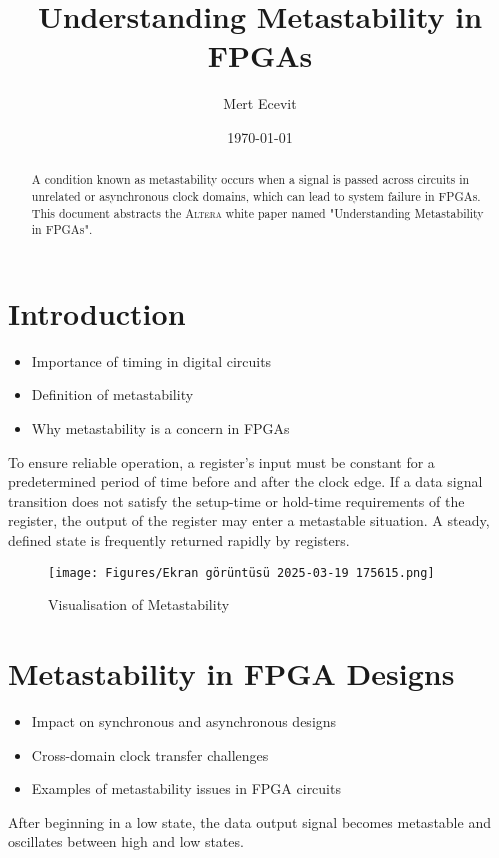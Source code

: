 \documentclass{article}
\title{Understanding Metastability in FPGAs}
\author{Mert Ecevit}
\date{\today}
\begin{document}
\maketitle
\newpage %

\begin{abstract}
A condition known as metastability occurs when a signal is passed across circuits in unrelated or asynchronous clock domains, which can lead to system failure in FPGAs. This document abstracts the \textsc{Altera} white paper named "Understanding Metastability in FPGAs".
\end{abstract}

\section{Introduction}
\begin{itemize}
    \item Importance of timing in digital circuits
    \item Definition of metastability
    \item Why metastability is a concern in FPGAs
\end{itemize}
To ensure reliable operation, a register's input must be constant for a predetermined period of time before and after the clock edge. If a data signal transition does not satisfy the setup-time or hold-time requirements of the register, the output of the register may enter a metastable situation. A steady, defined state is frequently returned rapidly by registers.\cite{altera_metastability}

\begin{figure}[htbp]
    \centering
    \texttt{[image: Figures/Ekran görüntüsü 2025-03-19 175615.png]}
    \caption{Visualisation of Metastability}
    \label{fig:enter-label}
\end{figure}

\section{Metastability in FPGA Designs}
\begin{itemize}
    \item Impact on synchronous and asynchronous designs
    \item Cross-domain clock transfer challenges
    \item Examples of metastability issues in FPGA circuits
\end{itemize}
After beginning in a low state, the data output signal becomes metastable and oscillates between high and low states.
\end{document}
